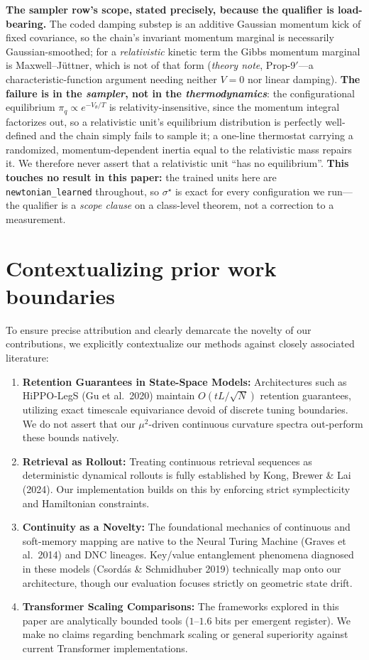 \documentclass{article}
\begin{document}
\textbf{The sampler row's scope, stated precisely, because the qualifier is load-bearing.} The coded damping substep is an additive Gaussian momentum kick of fixed covariance, so the chain's invariant momentum marginal is necessarily Gaussian-smoothed; for a \emph{relativistic} kinetic term the Gibbs momentum marginal is Maxwell--J\"uttner, which is not of that form (\emph{theory note}, Prop-9$'$---a characteristic-function argument needing neither $V=0$ nor linear damping). \textbf{The failure is in the \emph{sampler}, not in the \emph{thermodynamics}}: the configurational equilibrium $\pi_q\propto e^{-V_\theta/T}$ is relativity-insensitive, since the momentum integral factorizes out, so a relativistic unit's equilibrium distribution is perfectly well-defined and the chain simply fails to sample it; a one-line thermostat carrying a randomized, momentum-dependent inertia equal to the relativistic mass repairs it. We therefore never assert that a relativistic unit ``has no equilibrium''. \textbf{This touches no result in this paper:} the trained units here are \texttt{newtonian\_learned} throughout, so $\sigma^\star$ is exact for every configuration we run---the qualifier is a \emph{scope clause} on a class-level theorem, not a correction to a measurement.

\section{Contextualizing prior work boundaries}\label{app:pos}

To ensure precise attribution and clearly demarcate the novelty of our contributions, we explicitly contextualize our methods against closely associated literature:

\begin{enumerate}
    \item \textbf{Retention Guarantees in State-Space Models:} Architectures such as HiPPO-LegS (Gu et al.\ 2020) maintain $O(tL/\sqrt N)$ retention guarantees, utilizing exact timescale equivariance devoid of discrete tuning boundaries. We do not assert that our $\mu^2$-driven continuous curvature spectra out-perform these bounds natively.
    \item \textbf{Retrieval as Rollout:} Treating continuous retrieval sequences as deterministic dynamical rollouts is fully established by Kong, Brewer \& Lai (2024). Our implementation builds on this by enforcing strict symplecticity and Hamiltonian constraints.
    \item \textbf{Continuity as a Novelty:} The foundational mechanics of continuous and soft-memory mapping are native to the Neural Turing Machine (Graves et al.\ 2014) and DNC lineages. Key/value entanglement phenomena diagnosed in these models (Csord\'as \& Schmidhuber 2019) technically map onto our architecture, though our evaluation focuses strictly on geometric state drift.
    \item \textbf{Transformer Scaling Comparisons:} The frameworks explored in this paper are analytically bounded tools ($1$--$1.6$ bits per emergent register). We make no claims regarding benchmark scaling or general superiority against current Transformer implementations.
\end{enumerate}
\end{document}
